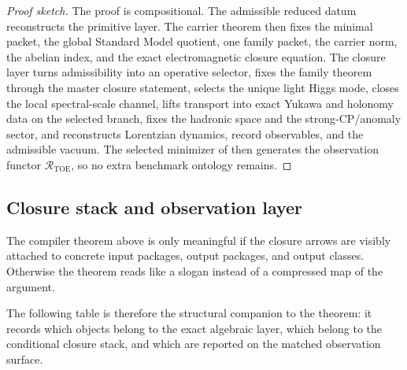 \documentclass[11pt,a4paper]{article}
\theoremstyle{definition}
\theoremstyle{remark}
\begin{document}
\begin{proof}[Proof sketch]
The proof is compositional. The admissible reduced datum reconstructs the primitive layer. The
carrier theorem then fixes the minimal packet, the global Standard Model quotient, one family
packet, the carrier norm, the abelian index, and the exact electromagnetic closure equation. The
closure layer turns admissibility into an operative selector, fixes the family theorem through the
master closure statement, selects the unique light Higgs mode, closes the local spectral-scale
channel, lifts transport into exact Yukawa and holonomy data on the selected branch, fixes the
hadronic space and the strong-CP/anomaly sector, and reconstructs Lorentzian dynamics, record
observables, and the admissible vacuum. The selected minimizer of
 then generates the observation functor
$\mathcal R_{\mathrm{TOE}}$, so no extra benchmark ontology remains.
\end{proof}

\subsection{Closure stack and observation layer}

The compiler theorem above is only meaningful if the closure arrows are visibly attached to
concrete input packages, output packages, and output classes. Otherwise the theorem reads like a
slogan instead of a compressed map of the argument.

The following table is therefore the structural companion to the theorem: it records which
objects belong to the exact algebraic layer, which belong to the conditional closure stack, and
which are reported on the matched observation surface.
\end{document}
